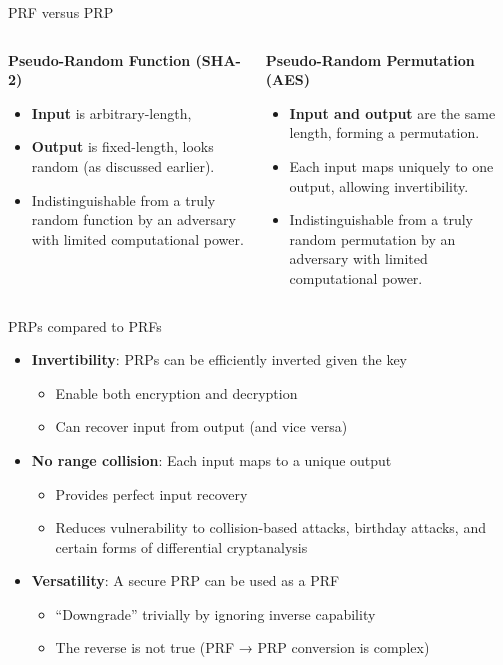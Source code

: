 \documentclass[aspectratio=169, lualatex, handout]{beamer}
\begin{document}
\begin{frame}{PRF versus PRP}
	\begin{columns}[c]
		\begin{column}{0.5\textwidth}
			\textbf{Pseudo-Random Function (SHA-2)}
			\begin{itemize}[<+->]
				\item \textbf{Input} is arbitrary-length,
				\item \textbf{Output} is fixed-length, looks random (as discussed
				      earlier).
				\item Indistinguishable from a truly random function by an adversary with
				      limited computational power.
			\end{itemize}
		\end{column}

		\begin{column}{0.5\textwidth}
			\textbf{Pseudo-Random Permutation (AES)}
			\begin{itemize}[<+->]
				\item \textbf{Input and output} are the same length, forming a permutation.
				\item Each input maps uniquely to one output, allowing invertibility.
				\item Indistinguishable from a truly random permutation by an adversary
				      with limited computational power.
			\end{itemize}
		\end{column}
	\end{columns}
\end{frame}

\begin{frame}{PRPs compared to PRFs}
	\begin{itemize}[<+->]
		\item \textbf{Invertibility}: PRPs can be efficiently inverted given the key
		      \begin{itemize}[<+->]
			      \item Enable both encryption and decryption
			      \item Can recover input from output (and vice versa)
		      \end{itemize}
		\item \textbf{No range collision}: Each input maps to a unique output
		      \begin{itemize}[<+->]
			      \item Provides perfect input recovery
			      \item Reduces vulnerability to collision-based attacks, birthday attacks, and certain forms of differential cryptanalysis
		      \end{itemize}
		\item \textbf{Versatility}: A secure PRP can be used as a PRF
		      \begin{itemize}[<+->]
			      \item ``Downgrade'' trivially by ignoring inverse capability
			      \item The reverse is not true (PRF → PRP conversion is complex)
		      \end{itemize}
	\end{itemize}
\end{frame}
\end{document}
